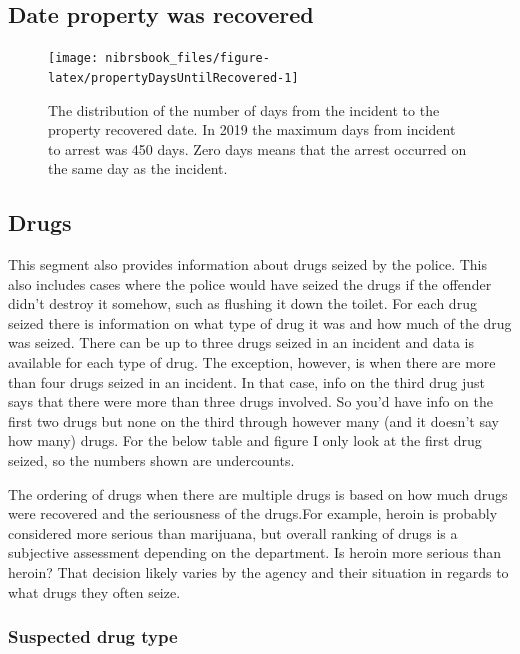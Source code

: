 \documentclass[
  12pt,
  openany]{book}
\begin{document}
\hypertarget{date-property-was-recovered}{%
\subsection{Date property was recovered}\label{date-property-was-recovered}}

\begin{figure}

{\centering \texttt{[image: nibrsbook\_files/figure-latex/propertyDaysUntilRecovered-1]} 

}

\caption{The distribution of the number of days from the incident to the property recovered date. In 2019 the maximum days from incident to arrest was 450 days. Zero days means that the arrest occurred on the same day as the incident. }\label{fig:propertyDaysUntilRecovered}
\end{figure}

\hypertarget{drugs}{%
\subsection{Drugs}\label{drugs}}

This segment also provides information about drugs seized by the police. This also includes cases where the police would have seized the drugs if the offender didn't destroy it somehow, such as flushing it down the toilet. For each drug seized there is information on what type of drug it was and how much of the drug was seized. There can be up to three drugs seized in an incident and data is available for each type of drug. The exception, however, is when there are more than four drugs seized in an incident. In that case, info on the third drug just says that there were more than three drugs involved. So you'd have info on the first two drugs but none on the third through however many (and it doesn't say how many) drugs. For the below table and figure I only look at the first drug seized, so the numbers shown are undercounts.

The ordering of drugs when there are multiple drugs is based on how much drugs were recovered and the seriousness of the drugs.For example, heroin is probably considered more serious than marijuana, but overall ranking of drugs is a subjective assessment depending on the department. Is heroin more serious than heroin? That decision likely varies by the agency and their situation in regards to what drugs they often seize.

\hypertarget{suspected-drug-type}{%
\subsubsection{Suspected drug type}\label{suspected-drug-type}}
\end{document}
